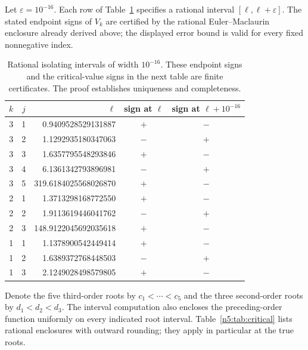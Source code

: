 Let $\varepsilon=10^{-16}$.  Each row of
Table~\ref{n5:tab:roots} specifies a rational interval
$[\ell,\ell+\varepsilon]$.  The stated endpoint signs of $V_k$ are
certified by the rational Euler--Maclaurin enclosure already derived above;
the displayed error bound is valid for every fixed nonnegative index.

\begin{table}[htbp]
\centering
\small
\begin{tabular}{ccrcc}
\toprule
$k$&$j$&$\ell$&sign at $\ell$&sign at $\ell+10^{-16}$\\
\midrule
3&1&0.9409528529131887&$+$&$-$\\
3&2&1.1292935180347063&$-$&$+$\\
3&3&1.6357795548293846&$+$&$-$\\
3&4&6.1361342793896981&$-$&$+$\\
3&5&319.6184025568026870&$+$&$-$\\
\midrule
2&1&1.3713298168772550&$+$&$-$\\
2&2&1.9113619446041762&$-$&$+$\\
2&3&148.9122045692035618&$+$&$-$\\
\midrule
1&1&1.1378900542449414&$+$&$-$\\
1&2&1.6389372768448503&$-$&$+$\\
1&3&2.1249028498579805&$+$&$-$\\
\bottomrule
\end{tabular}
\caption{Rational isolating intervals of width $10^{-16}$.  These
endpoint signs and the critical-value signs in the next table are finite
certificates.  The proof establishes uniqueness and completeness.}
\label{n5:tab:roots}
\end{table}

Denote the five third-order roots by $c_1<\cdots<c_5$ and the three
second-order roots by $d_1<d_2<d_3$.  The interval computation also
encloses the preceding-order function uniformly on every indicated
root interval.  Table~\ref{n5:tab:critical} lists rational enclosures
with outward rounding; they apply in particular at the true roots.

